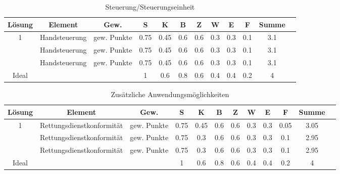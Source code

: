 \documentclass[10pt,a4paper]{article}
\begin{document}
\begin{table}[h!]
    \centering
    \begin{tabular}{cccccccccccc}
        \toprule
        \textbf{Lösung} & \textbf{Element} & \textbf{Gew.} & \textbf{S} & \textbf{K} & \textbf{B} & \textbf{Z} & \textbf{W} & \textbf{E} & \textbf{F} & \textbf{Summe} & \\
        \midrule
        1               & Handsteuerung    & gew. Punkte   & 0.75       & 0.45       & 0.6        & 0.6        & 0.3        & 0.3        & 0.1        & 3.1              \\
        \addlinespace
        2               & Handsteuerung    & gew. Punkte   & 0.75       & 0.45       & 0.6        & 0.6        & 0.3        & 0.3        & 0.1        & 3.1              \\
        \addlinespace
        3               & Handsteuerung    & gew. Punkte   & 0.75       & 0.45       & 0.6        & 0.6        & 0.3        & 0.3        & 0.1        & 3.1              \\
        \midrule
        Ideal           &                  &               & 1          & 0.6        & 0.8        & 0.6        & 0.4        & 0.4        & 0.2        & 4                \\
        \bottomrule
    \end{tabular}
    \caption{Steuerung/Steuerungseinheit}
    \label{tab:steuerung}
\end{table}

\begin{table}[h!]
    \centering
    \begin{tabular}{cccccccccccc}
        \toprule
        \textbf{Lösung} & \textbf{Element}          & \textbf{Gew.} & \textbf{S} & \textbf{K} & \textbf{B} & \textbf{Z} & \textbf{W} & \textbf{E} & \textbf{F} & \textbf{Summe} & \\
        \midrule
        1               & Rettungsdienstkonformität & gew. Punkte   & 0.75       & 0.45       & 0.6        & 0.6        & 0.3        & 0.3        & 0.05       & 3.05             \\
        \addlinespace
        2               & Rettungsdienstkonformität & gew. Punkte   & 0.75       & 0.3        & 0.6        & 0.6        & 0.3        & 0.3        & 0.1        & 2.95             \\
        \addlinespace
        3               & Rettungsdienstkonformität & gew. Punkte   & 0.75       & 0.3        & 0.6        & 0.6        & 0.3        & 0.3        & 0.1        & 2.95             \\
        \midrule
        Ideal           &                           &               & 1          & 0.6        & 0.8        & 0.6        & 0.4        & 0.4        & 0.2        & 4                \\
        \bottomrule
    \end{tabular}
    \caption{Zusätzliche Anwendungsmöglichkeiten}
    \label{tab:zusatz_anwendung}
\end{table}
\end{document}
